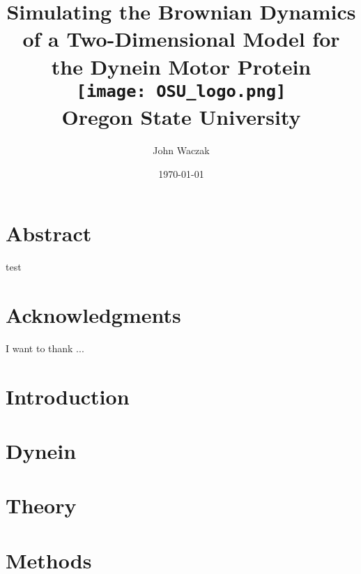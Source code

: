 \documentclass[12pt]{report}
\title{
	{Simulating the Brownian Dynamics of a Two-Dimensional Model for the Dynein Motor Protein}\vspace{1.5em}\\
	\texttt{[image: OSU\_logo.png]}\vspace{0.5em}\\
	\large{Oregon State University}
}
\author{John Waczak}
\date{\today}
\begin{document}
	\onehalfspacing
	
	\maketitle
	
	\chapter*{Abstract}
	test
	\chapter*{Acknowledgments}
	I want to thank ...
	
	\tableofcontents
	
	\chapter{Introduction}
	
	\chapter{Dynein}
	
	\chapter{Theory}
	
	\chapter{Methods}
	
	


\end{document}
